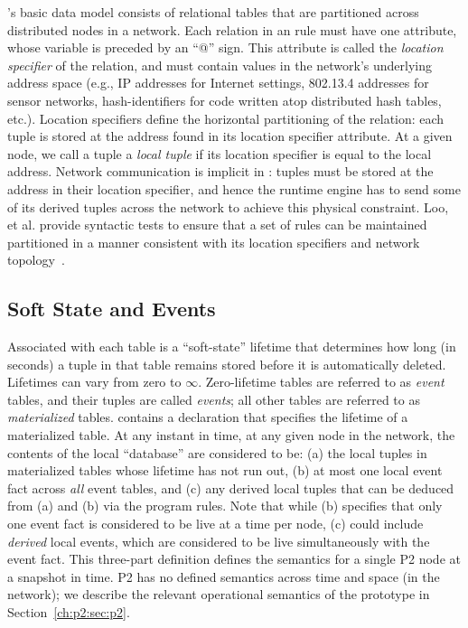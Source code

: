 \OVERLOG's basic data model consists of relational tables that are partitioned
across distributed nodes in a network.  Each relation in an \OVERLOG rule must
have one attribute, whose variable is preceded by an ``@'' sign.  This
attribute is called the {\em location specifier} of the relation, and must
contain values in the network's underlying address space (e.g., IP addresses
for Internet settings, 802.13.4 addresses for sensor networks, hash-identifiers
for code written atop distributed hash tables, etc.).  Location specifiers
define the horizontal partitioning of the relation: each tuple is stored at the
address found in its location specifier attribute.  At a given node, we call a
tuple a {\em local tuple} if its location specifier is equal to the local
address.  Network communication is implicit in \OVERLOG: tuples must be stored
at the address in their location specifier, and hence the runtime engine has to
send some of its derived tuples across the network to achieve this physical
constraint.  Loo, et al.  provide syntactic tests to ensure that a set of rules
can be maintained partitioned in a manner consistent with its location
specifiers and network topology~\cite{loo-sigmod06}.


\subsection{Soft State and Events}

Associated with each \OVERLOG table is a ``soft-state'' lifetime that
determines how long (in seconds) a tuple in that table remains stored before it
is automatically deleted.  Lifetimes can vary from zero to $\infty$.
Zero-lifetime tables are referred to as {\em event} tables, and their tuples
are called \emph{events}; all other tables are referred to as {\em
materialized} tables.  \OVERLOG contains a  declaration that
specifies the lifetime of a materialized table.  At any instant in time, at any
given node in the network, the contents of the local \OVERLOG ``database'' are
considered to be: (a) the local tuples in materialized tables whose lifetime
has not run out, (b) at most one local event fact across {\em all} event
tables, and (c) any derived local tuples that can be deduced from (a) and (b)
via the program rules.  Note that while (b) specifies that only one event fact
is considered to be live at a time per node, (c) could include {\em derived}
local events, which are considered to be live simultaneously with the event
fact.  This three-part definition defines the semantics for a single P2 node at
a snapshot in time.  P2 has no defined semantics across time and space (in the
network); we describe the relevant operational semantics of the prototype in
Section~\ref{ch:p2:sec:p2}.
     
